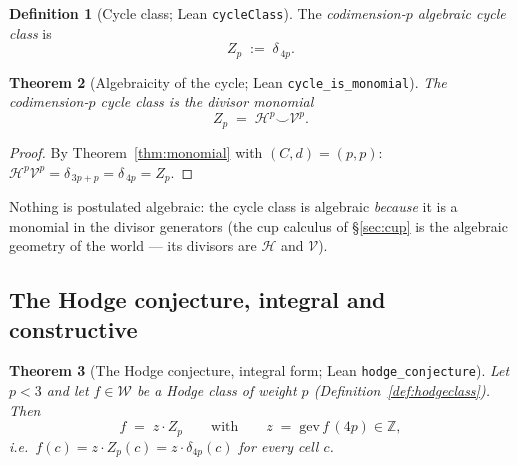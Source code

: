 \documentclass[11pt,a4paper]{article}
\theoremstyle{plain}
\newtheorem{theorem}{Theorem}[section]
\theoremstyle{definition}
\newtheorem{definition}[theorem]{Definition}
\newcommand{\Z}{\mathbb{Z}}
\newcommand{\HC}{\mathcal{H}}
\newcommand{\VV}{\mathcal{V}}
\newcommand{\cycleClass}[1]{Z_{#1}}
\newcommand{\cupop}{\smile}
\begin{document}
\begin{definition}[Cycle class; Lean \texttt{cycleClass}]\label{def:cycleclass}
The \emph{codimension-$p$ algebraic cycle class} is
\[
  \cycleClass{p} \;:=\; \delta_{\,4p}.
\]
\end{definition}

\begin{theorem}[Algebraicity of the cycle; Lean \texttt{cycle\_is\_monomial}]
\label{thm:cyclemono}
The codimension-$p$ cycle class is the divisor monomial
\[
  \cycleClass{p} \;=\; \HC^{p} \cupop \VV^{p}.
\]
\end{theorem}

\begin{proof}
By Theorem~\ref{thm:monomial} with $(C,d) = (p,p)$:
$\HC^{p}\VV^{p} = \delta_{\,3p+p} = \delta_{\,4p} = \cycleClass{p}$.
\end{proof}

Nothing is postulated algebraic: the cycle class is algebraic \emph{because}
it is a monomial in the divisor generators (the cup calculus of
\S\ref{sec:cup} is the algebraic geometry of the world --- its divisors are
$\HC$ and $\VV$).

\subsection{The Hodge conjecture, integral and constructive}

\begin{theorem}[The Hodge conjecture, integral form; Lean
\texttt{hodge\_conjecture}]\label{thm:hodgeconjecture}
Let $p < 3$ and let $f \in \mathcal{W}$ be a Hodge class of weight $p$
(Definition~\ref{def:hodgeclass}). Then
\[
  f \;=\; z \cdot \cycleClass{p} \qquad\text{with}\qquad
  z \;=\; \mathrm{gev}\,f\,(4p) \in \Z,
\]
i.e.\ $f(c) = z \cdot \cycleClass{p}(c) = z\cdot\delta_{4p}(c)$ for every
cell $c$.
\end{theorem}
\end{document}
